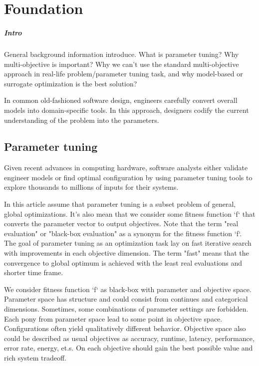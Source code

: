 \chapter{Foundation}

    \paragraph{Intro}
    General background information introduce. What is parameter tuning? Why multi-objective is important? Why we can't use the standard multi-objective approach in real-life problem/parameter tuning task, and why model-based or surrogate optimization is the best solution?

    In common old-fashioned software design, engineers carefully convert overall models into domain-specific tools. In this approach, designers codify the current understanding of the problem into the parameters. 

    \section{Parameter tuning}

        Given recent advances in computing hardware, software analysts either validate engineer models or find optimal configuration by using parameter tuning tools to explore thousands to millions of inputs for their systems. 

        In this article assume that parameter tuning is a subset problem of general, global optimizations. It's also mean that we consider some fitness function `f` that converts the parameter vector to output objectives.  Note that the term "real evaluation" or "black-box evaluation" as a synonym for the fitness function `f`.  The goal of parameter tuning as an optimization task lay on fast iterative search with improvements in each objective dimension. The term "fast" means that the convergence to global optimum is achieved with the least real evaluations and shorter time frame.

        We consider fitness function `f` as black-box with parameter and objective space. Parameter space has structure and could consist from continues and categorical dimensions. Sometimes, some combinations of parameter settings are forbidden. Each pony from parameter space lead to some point in objective space. Configurations often yield qualitatively different behavior.
        Objective space also could be described as usual objectives as accuracy, runtime, latency, performance, error rate, energy, et.s. On each objective should gain the best possible value and rich system tradeoff.

